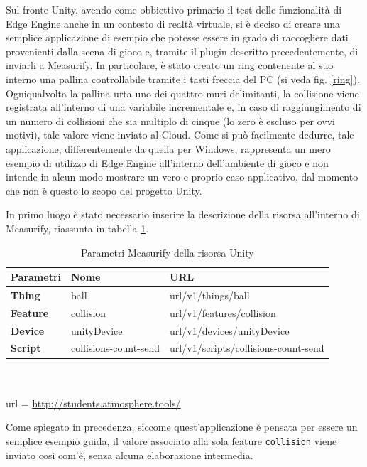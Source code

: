 Sul fronte Unity, avendo come obbiettivo primario il test delle funzionalità di Edge Engine anche in un contesto di realtà virtuale, si è deciso di creare una semplice applicazione di esempio che potesse essere in grado di raccogliere dati provenienti dalla scena di gioco e, tramite il plugin descritto precedentemente, di inviarli a Measurify. In particolare, è stato creato un ring contenente al suo interno una pallina controllabile tramite i tasti freccia del PC (si veda fig. \ref{ring}). Ogniqualvolta la pallina urta uno dei quattro muri delimitanti, la collisione viene registrata all'interno di una variabile incrementale e, in caso di raggiungimento di un numero di collisioni che sia multiplo di cinque (lo zero è escluso per ovvi motivi), tale valore viene inviato al Cloud. Come si può facilmente dedurre, tale applicazione, differentemente da quella per Windows, rappresenta un mero esempio di utilizzo di Edge Engine all'interno dell'ambiente di gioco e non intende in alcun modo mostrare un vero e proprio caso applicativo, dal momento che non è questo lo scopo del progetto Unity.

In primo luogo è stato necessario inserire la descrizione della risorsa all'interno di Measurify, riassunta in tabella \ref{descunitydev}.

\begin{table}[H]
	\begin{tabular}{|p{}|p{}|p{}|}
		\hline
		\textbf{Parametri} & \textbf{Nome} & \textbf{URL}\\
		\hline
		\textbf{Thing} & ball & {{url}}/v1/things/ball\\
		\hline
		\textbf{Feature} & collision & {{url}}/v1/features/collision\\
		\hline
		\textbf{Device} & unityDevice & {{url}}/v1/devices/unityDevice\\	
		\hline
		\textbf{Script} & collisions-count-send & {{url}}/v1/scripts/collisions-count-send\\	
		\hline
	\end{tabular}
	\\\\url = \url{http://students.atmosphere.tools/}
	\caption{Parametri Measurify della risorsa Unity}
	\label{descunitydev}
\end{table}

Come spiegato in precedenza, siccome quest'applicazione è pensata per essere un semplice esempio guida, il valore associato alla sola feature \texttt{collision} viene inviato così com'è, senza alcuna elaborazione intermedia.

